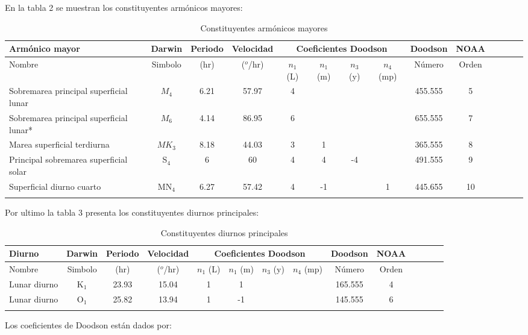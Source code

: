 \documentclass[12pt,letterpaper]{article}
\begin{document}
	
En la tabla 2 se muestran los constituyentes armónicos mayores\cite{a}:
\begin{center}
	\begin{longtable}{|p{2.7cm}|c|c|c|c|c|c|c|c|c|c|c|c|c}
  	\hline
Armónico mayor & Darwin & Periodo & Velocidad & \multicolumn{4}{c}{Coeficientes Doodson} & Doodson &  NOAA \\
\hline
Nombre & Simbolo & (hr) & ($^o$/hr) & $n_{1}$ (L) & $n_{1}$ (m) &	$n_{3}$ (y) &	$n_{4}$ (mp) & Número  & Orden\\
\hline
Sobremarea principal superficial lunar
& $M_{4}$ &	6.21 & 	57.97 &	4 & & & &  455.555 & 5\\
Sobremarea principal superficial lunar* & 	$M_{6}$ 	& 4.14& 	86.95 & 	6 & & & & 655.555 & 7 \\
Marea superficial terdiurna &
$MK_{3}$ & 	8.18 &	44.03 &	3 &	1 & & & 365.555 & 8 \\
Principal sobremarea superficial solar & S$_{4}$ &	6 &	60 &	4 &	4 &	-4 & & 491.555 & 9 \\
Superficial diurno cuarto &	MN$_4$ &	6.27 &	57.42 &	4 &	-1 & & 1 &	445.655 & 10\\

    \hline
\caption{Constituyentes armónicos mayores}  
\end{longtable}
\end{center}

Por ultimo la tabla 3 presenta los constituyentes diurnos principales\cite{a}:
\begin{center}
	\begin{longtable}{|p{2.7cm}|c|c|c|c|c|c|c|c|c|c|c|c|c}
  	\hline
Diurno & Darwin & Periodo & Velocidad & \multicolumn{4}{c}{Coeficientes Doodson} & Doodson &  NOAA \\
\hline
Nombre & Simbolo & (hr) & ($^o$/hr) & $n_{1}$ (L) & $n_{1}$ (m) &	$n_{3}$ (y) &	$n_{4}$ (mp) & Número  & Orden\\
\hline
Lunar diurno & 	K$_1$ & 	23.93 & 	15.04 & 	1 &	1 & & & 165.555 & 4\\
Lunar diurno &	O$_1$ &	25.82 & 	13.94 &	1 &	-1 & & & 145.555 & 6 \\
    \hline
\caption{Constituyentes diurnos principales}  
\end{longtable}
\end{center}

Los coeficientes de Doodson están dados por\cite{e}:
\end{document}
